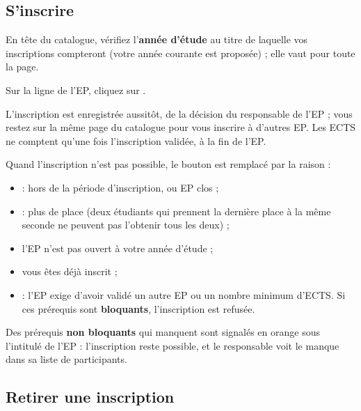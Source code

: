 \documentclass[11pt,a4paper]{article}
\begin{document}



\subsection{S'inscrire}

\begin{etapes}
  \item En tête du catalogue, vérifiez l'\textbf{année d'étude} au titre de laquelle vos
    inscriptions compteront (votre année courante est proposée) ; elle vaut pour toute la page.
  \item Sur la ligne de l'EP, cliquez sur .
\end{etapes}

L'inscription est enregistrée aussitôt,  de la décision du responsable de
l'EP ; vous restez sur la même page du catalogue pour vous inscrire à d'autres EP. Les ECTS ne
comptent qu'une fois l'inscription validée, à la fin de l'EP.

Quand l'inscription n'est pas possible, le bouton est remplacé par la raison :
\begin{itemize}
  \item {} : hors de la période d'inscription, ou EP clos ;
  \item {} : plus de place (deux étudiants qui prennent la dernière place à la
    même seconde ne peuvent pas l'obtenir tous les deux) ;
  \item l'EP n'est pas ouvert à votre année d'étude ;
  \item vous êtes déjà inscrit ;
  \item {} : l'EP exige d'avoir validé un autre EP ou un nombre
    minimum d'ECTS. Si ces prérequis sont \textbf{bloquants}, l'inscription est refusée.
\end{itemize}

Des prérequis \textbf{non bloquants} qui manquent sont signalés en orange sous l'intitulé de
l'EP : l'inscription reste possible, et le responsable voit le manque dans sa liste de
participants.

\subsection{Retirer une inscription}
\end{document}
